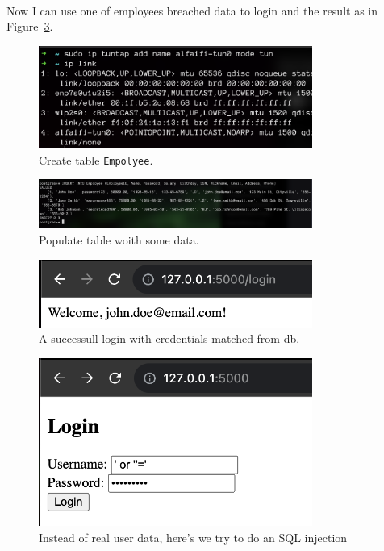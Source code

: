 \documentclass{article}
\def\c#1{\texttt{#1}}
\begin{document}
\paragraph*{} Now I can use one of employees breached data to login and the result as in Figure~\ref{fig:login}.


\begin{figure}[hb]
	\centering
	\includegraphics[width=0.8\textwidth]{./figures/create-tun.png}
	\caption{Create table \c{Empolyee}.}
	\label{fig:create-table}
\end{figure}

\begin{figure}[hb]
	\centering
	\includegraphics[width=0.8\textwidth]{./figures/populate.png}
	\caption{Populate table woith some data.}
	\label{fig:populate}
\end{figure}

\begin{figure}[hb]
	\centering
	\includegraphics[width=0.8\textwidth]{./figures/login.png}
	\caption{A successull login with credentials matched from db.}
	\label{fig:login}
\end{figure}

\begin{figure}[hb]
	\centering
	\includegraphics[width=0.8\textwidth]{./figures/sql-injection.png}
	\caption{Instead of real user data, here's we try to do an SQL injection}
	\label{fig:injection}
\end{figure}
\end{document}
